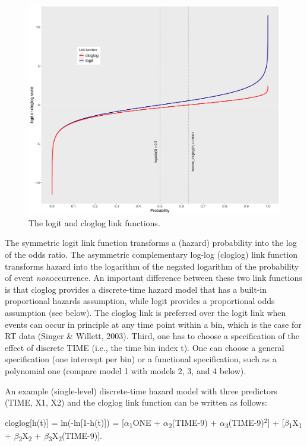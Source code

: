 \documentclass[
  man,floatsintext]{apa6}
\begin{document}
\begin{figure}[H]

{\centering \includegraphics[width=0.8\linewidth,height=0.67\textheight,]{../Tutorial_2_Bayesian/figures/linkfunctions} 

}

\caption{The logit and cloglog link functions.}\label{fig:plot-link-functions}
\end{figure}

The symmetric logit link function transforms a (hazard) probability into the log of the odds ratio. The asymmetric complementary log-log (cloglog) link function transforms hazard into the logarithm of the negated logarithm of the probability of event \emph{non}occurrence. An important difference between these two link functions is that cloglog provides a discrete-time hazard model that has a built-in proportional hazards assumption, while logit provides a proportional odds assumption (see below). The cloglog link is preferred over the logit link when events can occur in principle at any time point within a bin, which is the case for RT data (Singer \& Willett, 2003). Third, one has to choose a specification of the effect of discrete TIME (i.e., the time bin index t). One can choose a general specification (one intercept per bin) or a functional specification, such as a polynomial one (compare model 1 with models 2, 3, and 4 below).

An example (single-level) discrete-time hazard model with three predictors (TIME, X1, X2) and the cloglog link function can be written as follows:

cloglog{[}h(t){]} = ln(-ln{[}1-h(t){]}) = {[}\(\alpha\)\textsubscript{1}ONE + \(\alpha\)\textsubscript{2}(TIME-9) + \(\alpha\)\textsubscript{3}(TIME-9)\(^2\){]} + {[}\(\beta\)\textsubscript{1}X\textsubscript{1} + \(\beta\)\textsubscript{2}X\textsubscript{2} + \(\beta\)\textsubscript{3}X\textsubscript{2}(TIME-9){]}.
\end{document}
